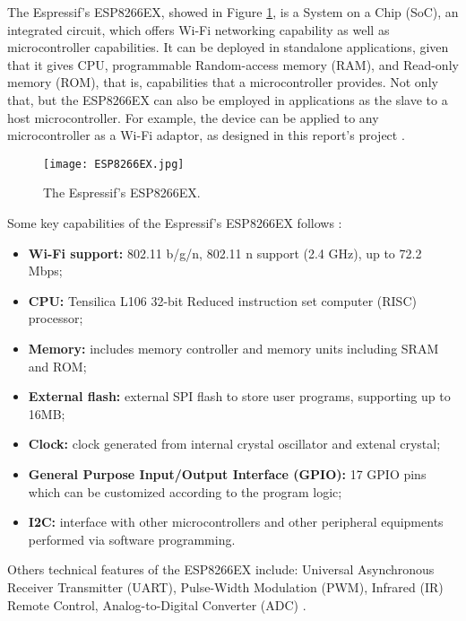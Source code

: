 The Espressif's ESP8266EX, showed in Figure \ref{fig:ESP8266EX}, is a System on a
Chip (SoC), an integrated circuit, which offers Wi-Fi networking capability as
well as microcontroller capabilities. It can be deployed in standalone
applications, given that it gives CPU, programmable Random-access memory (RAM), and Read-only memory (ROM), that is, capabilities that a microcontroller
provides. Not only that, but the ESP8266EX can also be employed in applications as
the slave to a host microcontroller. For example, the device can be applied to
any microcontroller as a Wi-Fi adaptor, as designed in this report's project \cite{wifi}.

\begin{figure}[h!]
    \centering
    \texttt{[image: ESP8266EX.jpg]}
    \caption{The Espressif's ESP8266EX.}
    \label{fig:ESP8266EX}
\end{figure}

Some key capabilities of the Espressif's ESP8266EX follows \cite{wifi}:

\begin{itemize}
    \item \textbf{Wi-Fi support:} 802.11 b/g/n, 802.11 n support (2.4 GHz), up to 72.2 Mbps;
    \item \textbf{CPU:} Tensilica L106 32-bit Reduced instruction set computer (RISC)
    processor;
    \item \textbf{Memory:} includes memory controller and memory units including
    SRAM and ROM;
    \item \textbf{External flash:} external SPI flash to store user programs,
    supporting up to 16MB;
    \item \textbf{Clock:} clock generated from internal crystal oscillator and
    extenal crystal;
    \item \textbf{General Purpose Input/Output Interface (GPIO):} 17 GPIO pins
    which can be customized according to the program logic;
    \item \textbf{I2C:} interface with other microcontrollers and other
    peripheral equipments performed via software programming.
\end{itemize}

Others technical features of the ESP8266EX include: Universal Asynchronous
Receiver Transmitter (UART), Pulse-Width Modulation (PWM), Infrared (IR) Remote
Control, Analog-to-Digital Converter (ADC) \cite{wifi}.


